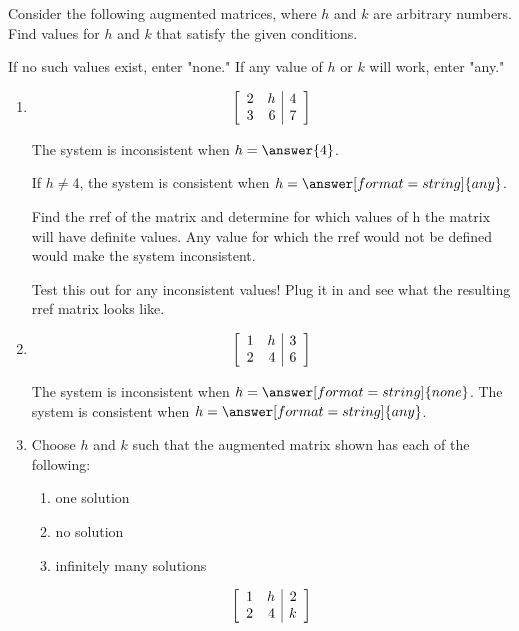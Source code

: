 \documentclass{ximera}
\author{Zack Reed}
\begin{document}
\begin{exercise}

    Consider the following augmented matrices, where $h$ and $k$ are arbitrary numbers. Find values for $h$ and $k$ that satisfy the given conditions.

    If no such values exist, enter "none." If any value of $h$ or $k$ will work, enter "any."

    \begin{enumerate}
        \item 
        \begin{equation*}
          \startmat{rr|r}
            2 & h & 4 \\
            3 & 6 & 7
          \stopmat
        \end{equation*}
  
        The system is inconsistent when $h = \answer{4}$.

        If $h\neq 4$, the system is consistent when $h = \answer[format=string]{any}$.

        \begin{hint}
        
            Find the rref of the matrix and determine for which values of h the matrix will have definite values. Any value for which the rref would not be defined would make the system inconsistent.

            Test this out for any inconsistent values! Plug it in and see what the resulting rref matrix looks like.


        \end{hint}
        
        
        \item 
        \begin{equation*}
          \startmat{rr|r}
            1 & h & 3 \\
            2 & 4 & 6
          \stopmat
        \end{equation*}

        The system is inconsistent when $h = \answer[format=string]{none}$. The system is consistent when $h = \answer[format=string]{any}$.
        
        
        \item Choose $h$ and $k$ such that the augmented matrix shown has each of the following:
        \begin{enumerate}
          \item one solution
          \item no solution
          \item infinitely many solutions
        \end{enumerate}
        \begin{equation*}
          \startmat{rr|r}
            1 & h & 2 \\
            2 & 4 & k
          \stopmat
        \end{equation*}
        

\end{enumerate}
\end{exercise}
\end{document}
